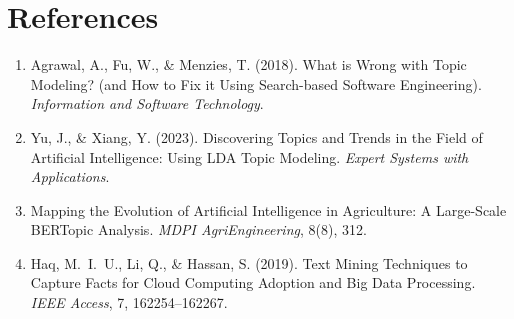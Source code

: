 \documentclass[11pt,a4paper]{article}
\begin{document}
\section{References}
\begin{enumerate}
    \item Agrawal, A., Fu, W., \& Menzies, T. (2018). What is Wrong
          with Topic Modeling? (and How to Fix it Using Search-based
          Software Engineering). \textit{Information and Software
          Technology}.
    \item Yu, J., \& Xiang, Y. (2023). Discovering Topics and Trends
          in the Field of Artificial Intelligence: Using LDA Topic
          Modeling. \textit{Expert Systems with Applications}.
    \item Mapping the Evolution of Artificial Intelligence in
          Agriculture: A Large-Scale BERTopic Analysis.
          \textit{MDPI AgriEngineering}, 8(8), 312.
    \item Haq, M.~I.~U., Li, Q., \& Hassan, S. (2019). Text Mining
          Techniques to Capture Facts for Cloud Computing Adoption
          and Big Data Processing. \textit{IEEE Access}, 7,
          162254--162267.
\end{enumerate}
\end{document}
